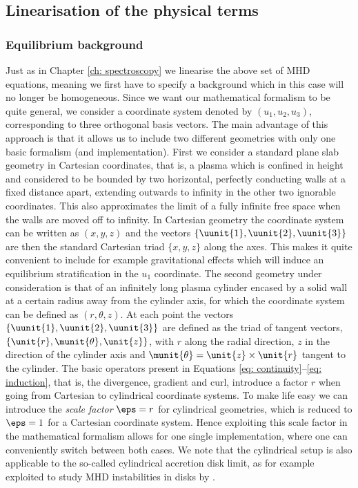 \subsection{Linearisation of the physical terms}
\subsubsection{Equilibrium background}
Just as in Chapter \ref{ch: spectroscopy} we linearise the above set of MHD equations, meaning we first have to specify a background which in this case will no longer be homogeneous. Since we want our mathematical formalism to be quite general, we consider a coordinate system denoted by $(u_1, u_2, u_3)$, corresponding to three orthogonal basis vectors. The main advantage of this approach is that it allows us to include two different geometries with only one basic formalism (and implementation). First we consider a standard plane slab geometry in Cartesian coordinates, that is, a plasma which is confined in height and considered to be bounded by two horizontal, perfectly conducting walls at a fixed distance apart, extending outwards to infinity in the other two ignorable coordinates. This also approximates the limit of a fully infinite free space when the walls are moved off to infinity. In Cartesian geometry the coordinate system can be written as $(x, y, z)$ and the vectors $\{\uunit{1}, \uunit{2}, \uunit{3}\}$ are then the standard Cartesian triad $\{\unit{x}, \unit{y}, \unit{z}\}$ along the axes. This makes it quite convenient to include for example gravitational effects which will induce an equilibrium stratification in the $u_1$ coordinate. The second geometry under consideration is that of an infinitely long plasma cylinder encased by a solid wall at a certain radius away from the cylinder axis, for which the coordinate system can be defined as $(r, \theta, z)$. At each point the vectors $\{\uunit{1}, \uunit{2}, \uunit{3}\}$ are defined as the triad of tangent vectors, $\{\unit{r}, \munit{\theta}, \unit{z}\}$, with $\unit{r}$ along the radial direction, $\unit{z}$ in the direction of the cylinder axis and $\munit{\theta} = \unit{z} \times \unit{r}$ tangent to the cylinder.
The basic operators present in Equations \eqref{eq: continuity}--\eqref{eq: induction}, that is, the divergence, gradient and curl, introduce a factor $r$ when going from Cartesian to cylindrical coordinate systems. To make life easy we can introduce the \emph{scale factor} $\eps = r$ for cylindrical geometries, which is reduced to $\eps = 1$ for a Cartesian coordinate system. Hence exploiting this scale factor in the mathematical formalism allows for one single implementation, where one can conveniently switch between both cases. We note that the cylindrical setup is also applicable to the so-called cylindrical accretion disk limit, as for example exploited to study MHD instabilities in disks by \citet{blokland2007}.

